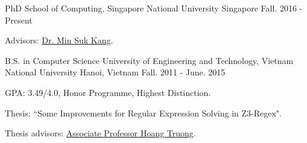 


\begin{cventries}

  \cventry
    {PhD} %
    {School of Computing, Singapore National University} %
    {Singapore} %
    {Fall. 2016 - Present} %
    {
      \begin{cvitems} %
        \item {Advisors: \href{http://www.comp.nus.edu.sg/~kangms/}{Dr. Min Suk Kang}.}
      \end{cvitems}
    }

  \cventry
    {B.S. in Computer Science} %
    {University of Engineering and Technology, Vietnam National University} %
    {Hanoi, Vietnam} %
    {Fall. 2011 - June. 2015} %
    {
      \begin{cvitems} %
        \item {GPA: 3.49/4.0, Honor Programme, Highest Distinction.}
        \item {Thesis: “Some Improvements for Regular Expression Solving in Z3-Regex".}
        \item {Thesis advisors: \href{http://www.uet.vnu.edu.vn/~hoangta/}{Associate Professor Hoang Truong}.}
      \end{cvitems}
    }


\end{cventries}
